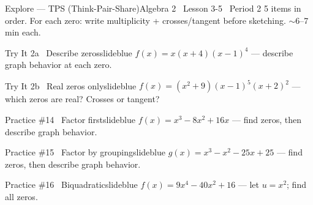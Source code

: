 \documentclass[aspectratio=169, 11pt]{beamer}
\begin{document}
\begin{frame}[allowframebreaks]{Explore --- TPS (Think-Pair-Share)}{Algebra 2 \textperiodcentered\ Lesson 3-5 \textperiodcentered\ Period 2}
\small\textcolor{slidegray}{5 items in order. For each zero: write multiplicity + crosses/tangent before sketching. \(\sim\)6--7 min each.}

\vspace{0.1cm}
\begin{projcard}{Try It 2a \textperiodcentered\ Describe zeros}{slideblue}
\(f(x) = x(x+4)(x-1)^4\) --- describe graph behavior at each zero.
\end{projcard}
\vspace{-0.15cm}
\begin{projcard}{Try It 2b \textperiodcentered\ Real zeros only}{slideblue}
\(f(x) = (x^2+9)(x-1)^5(x+2)^2\) --- which zeros are real? Crosses or tangent?
\end{projcard}
\vspace{-0.15cm}
\begin{projcard}{Practice \#14 \textperiodcentered\ Factor first}{slideblue}
\(f(x) = x^3 - 8x^2 + 16x\) --- find zeros, then describe graph behavior.
\end{projcard}
\vspace{-0.15cm}
\begin{projcard}{Practice \#15 \textperiodcentered\ Factor by grouping}{slideblue}
\(g(x) = x^3 - x^2 - 25x + 25\) --- find zeros, then describe graph behavior.
\end{projcard}
\vspace{-0.15cm}
\begin{projcard}{Practice \#16 \textperiodcentered\ Biquadratic}{slideblue}
\(f(x) = 9x^4 - 40x^2 + 16\) --- let \(u = x^2\); find all zeros.
\end{projcard}
\end{frame}
\end{document}
